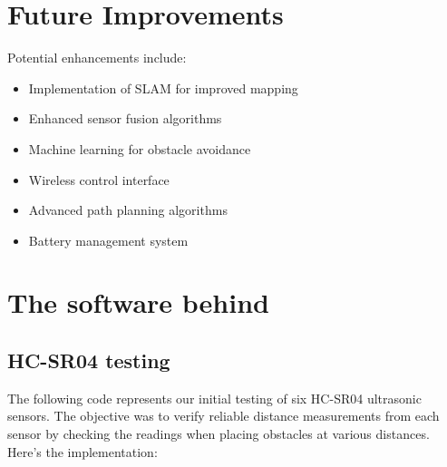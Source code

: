 \documentclass{article}
\begin{document}
\newpage
\section{Future Improvements}
Potential enhancements include:
\begin{itemize}
    \item Implementation of SLAM for improved mapping
    \item Enhanced sensor fusion algorithms
    \item Machine learning for obstacle avoidance
    \item Wireless control interface
    \item Advanced path planning algorithms
    \item Battery management system
\end{itemize}

\newpage
\section{The software behind} %
\newpage
\subsection{HC-SR04 testing}
The following code represents our initial testing of six HC-SR04 ultrasonic sensors. The objective was to verify reliable distance measurements from each sensor by checking the readings when placing obstacles at various distances. Here's the implementation:
\end{document}
